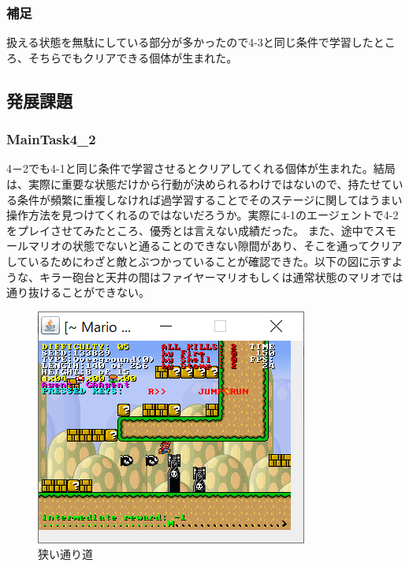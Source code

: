 \documentclass{jsarticle}
\begin{document}
\subsubsection{補足}
扱える状態を無駄にしている部分が多かったので4-3と同じ条件で学習したところ、そちらでもクリアできる個体が生まれた。
\subsection{発展課題}
\subsubsection{MainTask4\_2}
4－2でも4-1と同じ条件で学習させるとクリアしてくれる個体が生まれた。結局は、実際に重要な状態だけから行動が決められるわけではないので、持たせている条件が頻繁に重複しなければ過学習することでそのステージに関してはうまい操作方法を見つけてくれるのではないだろうか。実際に4-1のエージェントで4-2をプレイさせてみたところ、優秀とは言えない成績だった。
また、途中でスモールマリオの状態でないと通ることのできない隙間があり、そこを通ってクリアしているためにわざと敵とぶつかっていることが確認できた。以下の図に示すような、キラー砲台と天井の間はファイヤーマリオもしくは通常状態のマリオでは通り抜けることができない。
\begin{figure}[H]
	\includegraphics{narrow1.png}
	\caption{狭い通り道}
\end{figure}
\end{document}
